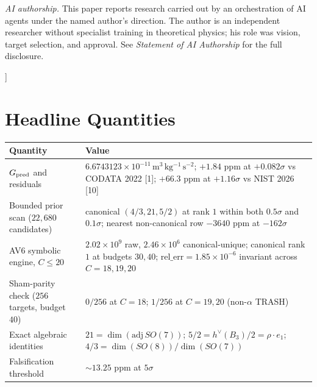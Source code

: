 \documentclass[
  11pt,
  letterpaper,
  twocolumn,
]{article}
\begin{document}
\begin{center}
\begin{minipage}{0.88\textwidth}
\vspace{8pt}
\noindent\small\textit{AI authorship.} This paper reports research carried out by an orchestration of AI agents under the named author's direction. The author is an independent researcher without specialist training in theoretical physics; his role was vision, target selection, and approval. See \emph{Statement of AI Authorship} for the full disclosure.

\end{minipage}
\end{center}
\vspace{1.5em}
]

\section{Headline Quantities}\label{headline-quantities}

\begin{table}[!htb]
\centering\small
\begin{tabular}{@{}
  >{\raggedright\arraybackslash}p{}
  >{\raggedright\arraybackslash}p{}@{}}
\toprule
\begin{minipage}[b]{\linewidth}\raggedright
Quantity
\end{minipage} & \begin{minipage}[b]{\linewidth}\raggedright
Value
\end{minipage} \\
\midrule
\(G_{\rm pred}\) and residuals &
\(6.6743123 \times 10^{-11}\,\mathrm{m^3\,kg^{-1}\,s^{-2}}\); \(+1.84\)
ppm at \(+0.082\sigma\) vs CODATA 2022 {[}1{]}; \(+66.3\) ppm at
\(+1.16\sigma\) vs NIST 2026 {[}10{]} \\
Bounded prior scan (\(22{,}680\) candidates) & canonical
\((4/3, 21, 5/2)\) at rank \(1\) within both \(0.5\sigma\) and
\(0.1\sigma\); nearest non-canonical row \(-3640\) ppm at
\(-162\sigma\) \\
AV6 symbolic engine, \(C\!\le\!20\) & \(2.02\!\times\!10^9\) raw,
\(2.46\!\times\!10^6\) canonical-unique; canonical rank \(1\) at budgets
\(30, 40\); \(\mathrm{rel\_err}=1.85\!\times\!10^{-6}\) invariant across
\(C\!=\!18,19,20\) \\
Sham-parity check (\(256\) targets, budget \(40\)) & \(0/256\) at
\(C\!=\!18\); \(1/256\) at \(C\!=\!19,20\) (non-\(\alpha\) TRASH) \\
Exact algebraic identities & \(21\!=\!\dim(\mathrm{adj}\,SO(7))\);
\(5/2\!=\!h^\vee(B_3)/2\!=\!\rho\!\cdot\!e_1\);
\(4/3\!=\!\dim(SO(8))/\dim(SO(7))\) \\
Falsification threshold & \(\sim\!13.25\) ppm at \(5\sigma\) \\
\bottomrule
\end{tabular}
\end{table}
\end{document}
